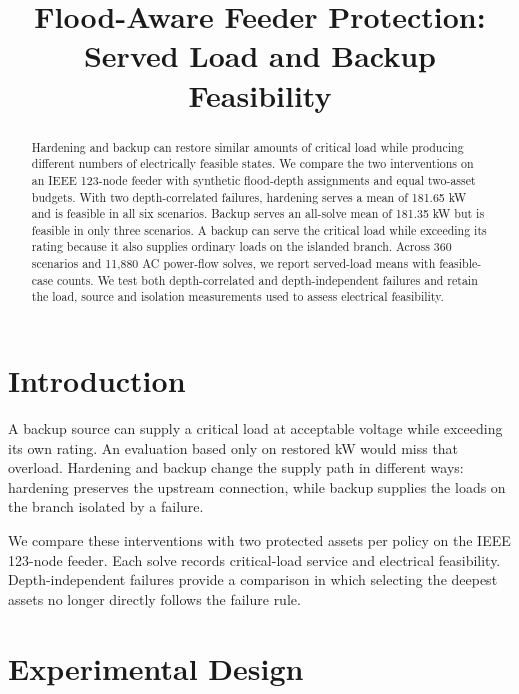 \documentclass[conference]{IEEEtran}
\begin{document}
\title{Flood-Aware Feeder Protection:\\Served Load and Backup Feasibility}

\author{}

\maketitle

\begin{abstract}

Hardening and backup can restore similar amounts of critical load while producing different numbers of electrically feasible states. We compare the two interventions on an IEEE 123-node feeder with synthetic flood-depth assignments and equal two-asset budgets. With two depth-correlated failures, hardening serves a mean of 181.65 kW and is feasible in all six scenarios. Backup serves an all-solve mean of 181.35 kW but is feasible in only three scenarios. A backup can serve the critical load while exceeding its rating because it also supplies ordinary loads on the islanded branch. Across 360 scenarios and 11,880 AC power-flow solves, we report served-load means with feasible-case counts. We test both depth-correlated and depth-independent failures and retain the load, source and isolation measurements used to assess electrical feasibility.

\end{abstract}

\section{Introduction}

A backup source can supply a critical load at acceptable voltage while exceeding its own rating. An evaluation based only on restored kW would miss that overload. Hardening and backup change the supply path in different ways: hardening preserves the upstream connection, while backup supplies the loads on the branch isolated by a failure.

We compare these interventions with two protected assets per policy on the IEEE 123-node feeder. Each solve records critical-load service and electrical feasibility. Depth-independent failures provide a comparison in which selecting the deepest assets no longer directly follows the failure rule.

\section{Experimental Design}
\end{document}
